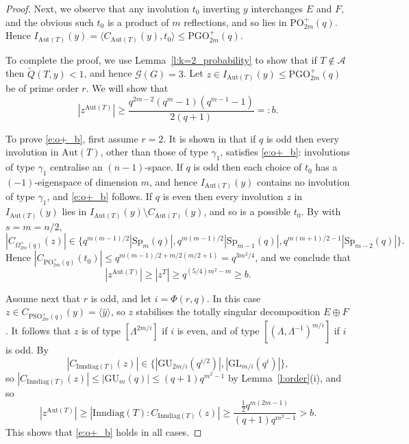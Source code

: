 \documentclass[twoside,a4paper,reqno,11pt]{amsart}
\newcommand{\<}{\langle}
\renewcommand{\>}{\rangle}
\newcommand{\la}{\langle}
\newcommand{\ra}{\rangle}
\newcommand{\leqs}{\leqslant}
\newcommand{\geqs}{\geqslant}
\newcommand{\Aut}{\mathrm{Aut}}
\newcommand{\GL}{\mathrm{GL}}
\newcommand{\Sp}{\mathrm{Sp}}
\newcommand{\GU}{\mathrm{GU}}
\theoremstyle{definition}
\begin{document}
\begin{proof}
    Next, we observe that any involution $t_0$ inverting $y$ interchanges $E$ and $F$, and the obvious such $t_0$ is a product of $m$ reflections, and so lies in $\mathrm{PO}_{2m}^+(q)$. Hence $I_{\Aut(T)}(y)  = \langle C_{\Aut(T)}(y), t_0 \rangle \leqs \mathrm{PGO}_{2m}^+(q)$.  
    
	To complete the proof, we use Lemma~\ref{l:k=2_probability} to show that if $T \not\in \mathcal{A}$ then
    $\widetilde{Q}(T,y) < 1$, and hence $\mathcal{G}(G) = 3$. 
	Let $z\in I_{\Aut(T)}(y) \leqs \mathrm{PGO}_{2m}^+(q)$ be of prime order $r$. We will show that
	\begin{equation}\label{e:o+_b}
	|z^{\Aut(T)}| \geqs \frac{q^{2m-2}(q^m-1)(q^{m-1}-1)}{2(q+1)} =: b.
	\end{equation}
	
    To prove \eqref{e:o+_b}, first assume $r = 2$. It is shown in \cite[Proposition 2.7(vi)]{BH_Sylow} that if $q$ is odd then every involution in $\Aut(T)$, other than those of type $\gamma_1$, satisfies \eqref{e:o+_b}: involutions of type $\gamma_1$ centralise an $(n-1)$-space. If $q$ is odd then each choice of $t_0$ has a $(-1)$-eigenspace of dimension $m$, and hence $I_{\Aut(T)}(y)$ contains no involution of type $\gamma_1$, and \eqref{e:o+_b} follows.
    If $q$ is even then every involution $z$ in $I_{\Aut(T)}(y)$ lies in $I_{\Aut(T)}(y) \setminus C_{\Aut(T)}(y)$, and so is a possible $t_0$. By \cite[Proposition 3.5.16]{BG_classical} with $s = m = n/2$, 
    \[|C_{\Omega^+_{2m}(q)}(z)| \in \{q^{m(m-1)/2}|\Sp_m(q)|, q^{m(m-1)/2}|\Sp_{m-1}(q)|, q^{m(m+1)/2 - 1}|\Sp_{m-2}(q)|\}.\] 
    Hence $|C_{\mathrm{PO}^+_{2m}(q)}(t_0)| \leqs q^{m(m-1)/2 + m/2(m/2+1)} = q^{3m^2/4}$, and we conclude that \[|z^{\Aut(T)}| \geqs |z^T| \geqs q^{(5/4)m^2 - m} \geqs b.\]   
    
     
     Assume next that $r$ is odd, and let $i = \Phi(r,q)$. In this case $z\in C_{\mathrm{PSO}_{2m}^+(q)}(y) = \la \widehat{y}\ra$, so $z$ stabilises the totally singular decomposition $E\oplus F$. It follows that $z$ is of type $[\Lambda^{2m/i}]$ if $i$ is even, and of type $[(\Lambda,\Lambda^{-1})^{m/i}]$ if $i$ is odd. By \cite[Table B.12]{BG_classical} 
	\begin{equation*}
	|C_{\mathrm{Inndiag}(T)}(z)| \in \{ |\GU_{2m/i}(q^{i/2})|, |\GL_{m/i}(q^i)|\},
	\end{equation*}
	so $|C_{\mathrm{Inndiag}(T)}(z)| \leqs |\GU_m(q)| \leqs (q+1)q^{m^2-1}$ by Lemma~\ref{l:order}(i), and so
	\begin{equation*}
	|z^{\Aut(T)}| \geqs |\mathrm{Inndiag}(T):C_{\mathrm{Inndiag}(T)}(z)| \geqs \frac{\frac{1}{2}q^{m(2m-1)}}{(q+1)q^{m^2-1}} > b.
	\end{equation*}
	This shows that \eqref{e:o+_b} holds in all cases.


\end{proof}
\end{document}
